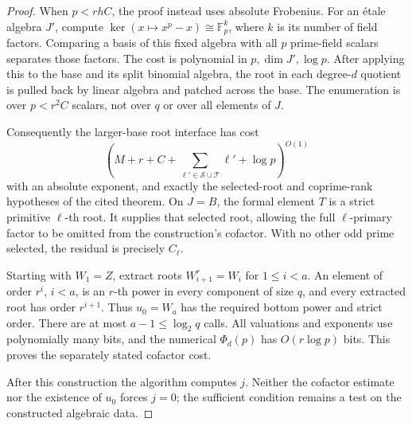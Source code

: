 \documentclass[11pt]{article}
\theoremstyle{definition}
\theoremstyle{remark}
\begin{document}
\begin{proof}
When \(p<rhC\), the proof instead uses absolute Frobenius.
For an \'{e}tale algebra \(J'\), compute
\(\ker(x\mapsto x^p-x)\cong\mathbb F_p^k\), where \(k\)
is its number of field factors.
Comparing a basis of this fixed algebra with all \(p\)
prime-field scalars separates those factors.
The cost is polynomial in \(p,\dim J',\log p\).
After applying this to the base and its split binomial algebra,
the root in each degree-\(d\) quotient is pulled back by
linear algebra and patched across the base.
The enumeration is over \(p<r^2C\) scalars, not over \(q\)
or over all elements of \(J\).

Consequently the larger-base root interface has cost
\[
        \left(M+r+C+\sum_{\ell'\in\mathcal S\cup\mathcal T}\ell'
                         +\log p\right)^{O(1)}
\]
with an absolute exponent, and exactly the selected-root and
coprime-rank hypotheses of the cited theorem.
On \(J=B\), the formal element \(T\) is a strict primitive
\(\ell\)-th root.  It supplies that selected root, allowing
the full \(\ell\)-primary factor to be omitted from the
construction's cofactor.  With no other odd prime selected,
the residual is precisely \(C_\ell\).

Starting with \(W_1=Z\), extract roots
\(W_{i+1}^r=W_i\) for \(1\leq i<a\).
An element of order \(r^i\), \(i<a\), is an \(r\)-th power
in every component of size \(q\), and every extracted root
has order \(r^{i+1}\).  Thus \(u_0=W_a\) has the required
bottom power and strict order.
There are at most \(a-1\leq\log_2q\) calls.
All valuations and exponents use polynomially many bits,
and the numerical \(\Phi_d(p)\) has \(O(r\log p)\) bits.
This proves the separately stated cofactor cost.

After this construction the algorithm computes \(j\).
Neither the cofactor estimate nor the existence of \(u_0\)
forces \(j=0\); the sufficient condition remains a test on
the constructed algebraic data.
\end{proof}
\end{document}
